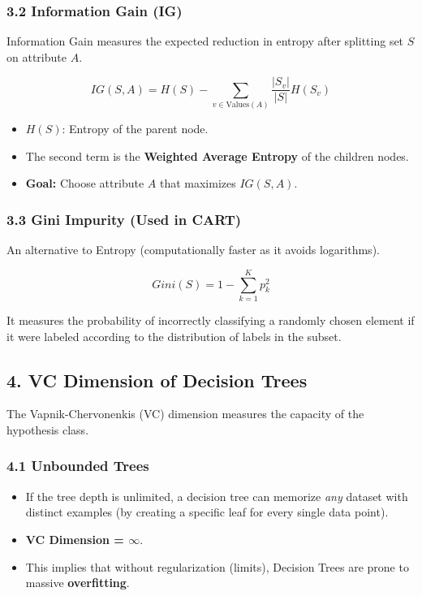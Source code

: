 \documentclass[
  italian,
  11pt,
]{article}
\begin{document}
\subsubsection{3.2 Information Gain (IG)}\label{information-gain-ig}

Information Gain measures the expected reduction in entropy after
splitting set \(S\) on attribute \(A\).

\[IG(S, A) = H(S) - \sum_{v \in \text{Values}(A)} \frac{|S_v|}{|S|} H(S_v)\]

\begin{itemize}
\item
  \(H(S)\): Entropy of the parent node.
\item
  The second term is the \textbf{Weighted Average Entropy} of the
  children nodes.
\item
  \textbf{Goal:} Choose attribute \(A\) that maximizes \(IG(S, A)\).
\end{itemize}

\subsubsection{3.3 Gini Impurity (Used in
CART)}\label{gini-impurity-used-in-cart}

An alternative to Entropy (computationally faster as it avoids
logarithms).

\[Gini(S) = 1 - \sum_{k=1}^K p_k^2\]

It measures the probability of incorrectly classifying a randomly chosen
element if it were labeled according to the distribution of labels in
the subset.

\subsection{4. VC Dimension of Decision
Trees}\label{vc-dimension-of-decision-trees}

The Vapnik-Chervonenkis (VC) dimension measures the capacity of the
hypothesis class.

\subsubsection{4.1 Unbounded Trees}\label{unbounded-trees}

\begin{itemize}
\item
  If the tree depth is unlimited, a decision tree can memorize
  \emph{any} dataset with distinct examples (by creating a specific leaf
  for every single data point).
\item
  \textbf{VC Dimension = \(\infty\)}.
\item
  This implies that without regularization (limits), Decision Trees are
  prone to massive \textbf{overfitting}.
\end{itemize}
\end{document}
